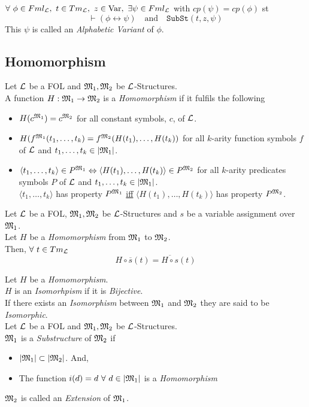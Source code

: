 \documentclass[11pt,a4paper]{article}
\begin{document}
$\forall\ \phi\in Fml_\LL,\ t\in Tm_\LL ,\ z\in\var,\ \exists \psi\in Fml_\LL$ with $cp(\psi)=cp(\phi)$ st
$$\vdash(\phi\leftrightarrow\psi)\quad\text{and}\quad\mathtt{SubSt}(t,z,\psi)$$
\nb This $\psi$ is called an \textit{Alphabetic Variant} of $\phi$.

\subsection{Homomorphism}

Let $\mathcal{L}$ be a FOL and $\mathfrak{M}_1,\mathfrak{M}_2$ be $\mathcal{L}$-Structures.\\
A function $H:\mathfrak{M}_1\to\mathfrak{M}_2$ is a \textit{Homomorphism} if it fulfils the following
\begin{itemize}
	\item $H(c^{\mathfrak{M}_1})=c^{\mathfrak{M}_2}$ for all constant symbols, $c$, of $\mathcal{L}$.
	\item $H(f^{\mathfrak{M}_1}(t_1,\dots,t_k)=f^{\mathfrak{M}_2}(H(t_1),\dots,H(t_k))$ for all $k$-arity function symbols $f$ of $\mathcal{L}$ and $t_1,\dots,t_k\in|\mathfrak{M}_1|$.
	\item $\langle t_1,\dots,t_k\rangle\in P^{\mathfrak{M}_1}\Leftrightarrow\langle H(t_1),\dots,H(t_k)\rangle\in P^{\mathfrak{M}_2}$ for all $k$-arity predicates symbols $P$ of $\mathcal{L}$ and $t_1,\dots,t_k\in|\mathfrak{M}_1|$.\\
	\ie $\langle t_1,\dots,t_k\rangle$ has property $P^{\mathfrak{M}_1}$ \underline{iff} $\langle H(t_1),\dots,H(t_k)\rangle$ has property $P^{\mathfrak{M}_2}$.
\end{itemize}

Let $\mathcal{L}$ be a FOL, $\mathfrak{M}_1,\mathfrak{M}_2$ be $\mathcal{L}$-Structures and $s$ be a variable assignment over $\mathfrak{M}_1$.\\
Let $H$ be a \textit{Homomorphism} from $\mathfrak{M}_1$ to $\mathfrak{M}_2$.\\
Then, $\forall\ t\in Tm_{\mathcal{L}}$
$$H\circ\overline{s}(t)=\overline{H\circ s}(t)$$

Let $H$ be a \textit{Homomorphism}.\\
$H$ is an \textit{Isomorhpism} if it is \textit{Bijective}.\\
\nb If there exists an \textit{Isomorphism} between $\mathfrak{M}_1$ and $\mathfrak{M}_2$ they are said to be \textit{Isomorphic}.\\

Let $\mathcal{L}$ be a FOL and $\mathfrak{M}_1,\mathfrak{M}_2$ be $\mathcal{L}$-Structures.\\
$\mathfrak{M}_1$ is a \textit{Substructure} of $\mathfrak{M}_2$ if
\begin{itemize}
	\item $|\mathfrak{M}_1|\subset|\mathfrak{M}_2|$. And,
	\item The function $i(d)=d\ \forall\ d\in|\M_1|$ is a \textit{Homomorphism}
\end{itemize}
\nb $\mathfrak{M}_2$ is called an \textit{Extension} of $\mathfrak{M}_1$.\\
\end{document}
